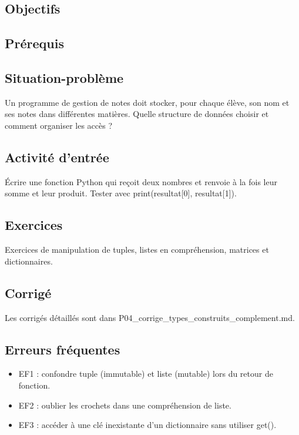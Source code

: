 \subsection{Objectifs}

\subsection{Prérequis}

\subsection{Situation-problème}

Un programme de gestion de notes doit stocker, pour chaque élève, son
nom et ses notes dans différentes matières. Quelle structure de données
choisir et comment organiser les accès ?

\subsection{Activité d’entrée}

Écrire une fonction Python qui reçoit deux nombres et renvoie à la fois
leur somme et leur produit. Tester avec print(resultat{[}0{]},
resultat{[}1{]}).

\subsection{Exercices}

Exercices de manipulation de tuples, listes en compréhension, matrices
et dictionnaires.

\subsection{Corrigé}

Les corrigés détaillés sont dans
P04\_corrige\_types\_construits\_complement.md.

\subsection{Erreurs fréquentes}

\begin{itemize}
\tightlist
\item
  EF1 : confondre tuple (immutable) et liste (mutable) lors du retour de
  fonction.
\item
  EF2 : oublier les crochets dans une compréhension de liste.
\item
  EF3 : accéder à une clé inexistante d'un dictionnaire sans utiliser
  get().
\end{itemize}

